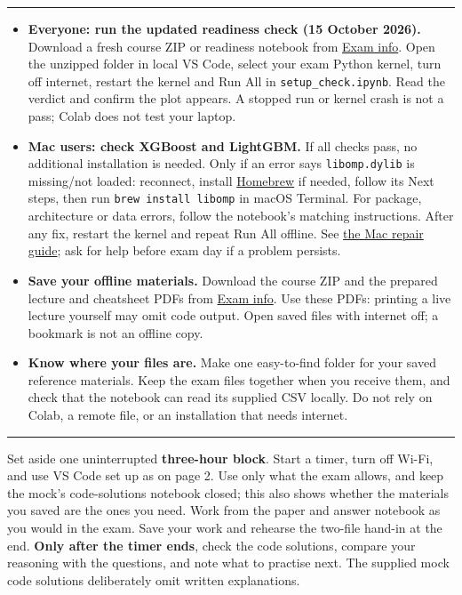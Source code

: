 \documentclass[10pt,a4paper]{article}
\newcommand{\sectionhead}[1]{\Needspace{5\baselineskip}\vspace{4pt}{\large\bfseries\color{accent}#1}\par\vspace{1pt}\hrule\vspace{3pt}}
\begin{document}
\sectionhead{Before the exam}
\begin{itemize}
\item \textbf{Everyone: run the updated readiness check (15 October 2026).} Download a fresh course ZIP or readiness notebook from \href{https://theill95.github.io/mlfin-2026/exam_info.html#readiness}{Exam info}. Open the unzipped folder in local VS Code, select your exam Python kernel, turn off internet, restart the kernel and Run All in \texttt{setup\_check.ipynb}. Read the verdict and confirm the plot appears. A stopped run or kernel crash is not a pass; Colab does not test your laptop.
\item \textbf{Mac users: check XGBoost and LightGBM.} If all checks pass, no additional installation is needed. Only if an error says \texttt{libomp.dylib} is missing/not loaded: reconnect, install \href{https://brew.sh/}{Homebrew} if needed, follow its Next steps, then run \texttt{brew install libomp} in macOS Terminal. For package, architecture or data errors, follow the notebook's matching instructions. After any fix, restart the kernel and repeat Run All offline. See \href{https://theill95.github.io/mlfin-2026/setup.html#macos}{the Mac repair guide}; ask for help before exam day if a problem persists.
\item \textbf{Save your offline materials.} Download the course ZIP and the prepared lecture and cheatsheet PDFs from \href{https://theill95.github.io/mlfin-2026/exam_info.html}{Exam info}. Use these PDFs: printing a live lecture yourself may omit code output. Open saved files with internet off; a bookmark is not an offline copy.
\item \textbf{Know where your files are.} Make one easy-to-find folder for your saved reference materials. Keep the exam files together when you receive them, and check that the notebook can read its supplied CSV locally. Do not rely on Colab, a remote file, or an installation that needs internet.
\end{itemize}

\sectionhead{Use a mock as a rehearsal}
Set aside one uninterrupted \textbf{three-hour block}. Start a timer, turn off Wi-Fi, and use VS Code set up as on page 2. Use only what the exam allows, and keep the mock's code-solutions notebook closed; this also shows whether the materials you saved are the ones you need. Work from the paper and answer notebook as you would in the exam. Save your work and rehearse the two-file hand-in at the end. \textbf{Only after the timer ends}, check the code solutions, compare your reasoning with the questions, and note what to practise next. The supplied mock code solutions deliberately omit written explanations.
\end{document}
